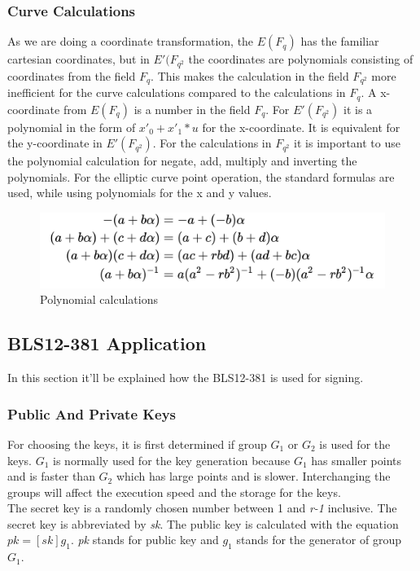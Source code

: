 \documentclass{article}
\begin{document}
\subsubsection{Curve Calculations}
As we are doing a coordinate transformation, the \(E(F_q)\) has the familiar cartesian coordinates, but in \(E'(F_{q^2}\) the coordinates are polynomials consisting of coordinates from the field \(F_q\). This makes the calculation in the field \(F_{q^2}\) more inefficient for the curve calculations compared to the calculations in \(F_q\). 
A x-coordinate from \(E(F_q)\) is a number in the field \(F_q\). For \(E'(F_{q^2})\) it is a polynomial in the form of \(x'_0 + x'_1 * u\) for the x-coordinate. It is equivalent for the y-coordinate in \(E'(F_{q^2})\). For the calculations in \(F_{q^2}\) it is important to use the polynomial calculation for negate, add, multiply and inverting the polynomials.
For the elliptic curve point operation, the standard formulas are used, while using polynomials for the x and y values.
\begin{figure}[H]
    \centering
    \includegraphics[width=0.5\linewidth]{polynomial_calc.png}
    \caption{Polynomial calculations}
    \label{Fig: polynomial calculations}
\end{figure}

\subsection{BLS12-381 Application}

In this section it'll be explained how the BLS12-381 is used for signing.

\subsubsection{Public And Private Keys}
For choosing the keys, it is first determined if group \(G_1\) or \(G_2\) is used for the keys. \(G_1\) is normally used for the key generation because \(G_1\) has smaller points and is faster than \(G_2\) which has large points and is slower. Interchanging the groups will affect the execution speed and the storage for the keys.\\
The secret key is a randomly chosen number between 1 and \textit{r-1} inclusive. The secret key is abbreviated by \textit{sk}. The public key is calculated with the equation \(pk = [sk]g_1\). \textit{pk} stands for public key and \(g_1\) stands for the generator of group \(G_1\). \cite{bls12-381-hackmd}
\end{document}
